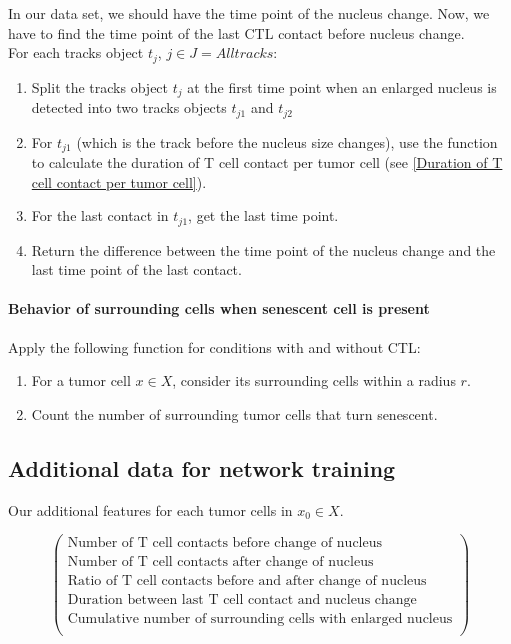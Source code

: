 \documentclass{report}
\begin{document}
In our data set, we should have the time point of the nucleus change. Now, we have to find the time point of the last CTL contact before nucleus change.\\

For each tracks object $t_j$, $j\in J = {All tracks}$:

\begin{enumerate}
	\item Split the tracks object $t_j$ at the first time point when an enlarged nucleus is detected into two tracks objects $t_{j1}$ and $t_{j2}$
	\item For $t_{j1}$ (which is the track before the nucleus size changes), use the function to calculate the duration of T cell contact per tumor cell (see \ref{Duration of T cell contact per tumor cell}).
	\item For the last contact in $t_{j1}$, get the last time point.
	\item Return the difference between the time point of the nucleus change and the last time point of the last contact.
\end{enumerate}


\paragraph{Behavior of surrounding cells when senescent cell is present}

Apply the following function for conditions with and without CTL:

\begin{enumerate}
	\item For a tumor cell $x \in X$, consider its surrounding cells within a radius $r$.
	\item Count the number of surrounding tumor cells that turn senescent.
\end{enumerate}

\subsection{Additional data for network training}

Our additional features for each tumor cells in $x_0 \in X$.

\begin{equation*}
 \left(
	\begin{array}{c}
		\text{Number of T cell contacts before change of nucleus}\\
		\text{Number of T cell contacts after change of nucleus}\\
		\text{Ratio of T cell contacts before and after change of nucleus}\\
		\text{Duration between last T cell contact and nucleus change}\\
		\text{Cumulative number of surrounding cells with enlarged nucleus}\\
	\end{array}
\right) 
\end{equation*}
\end{document}
